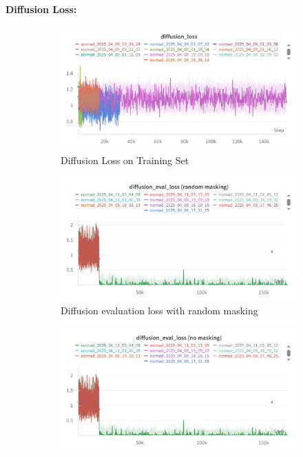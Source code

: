 \documentclass[12pt]{article}
\begin{document}
\newpage
\noindent \textbf{Diffusion Loss:}\\
\begin{figure}[H]
    \centering
    \begin{subfigure}[b]{0.48\textwidth}
        \centering
        \includegraphics[width=\textwidth]{images/diffusion_loss.png}
        \caption{Diffusion Loss on Training Set}
        \label{fig:diffusion_loss}
    \end{subfigure}
    \hfill
    \begin{subfigure}[b]{0.48\textwidth}
        \centering
        \includegraphics[width=\textwidth]{images/diffusion_eval_loss_random_masking.png}
        \caption{Diffusion evaluation loss with random masking}
        \label{fig:diffusion_eval_loss_random_masking}
    \end{subfigure}
    \begin{subfigure}[H]{0.48\textwidth}
        \centering
        \includegraphics[width=\textwidth]{images/diffusion_eval_loss_no_masking.png}

\end{subfigure}
\end{figure}
\end{document}
